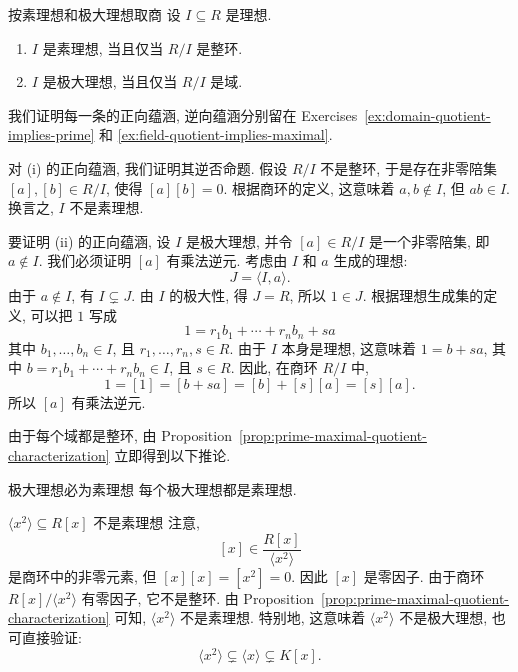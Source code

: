 \begin{Proposition}{按素理想和极大理想取商}\label{prop:prime-maximal-quotient-characterization}
  设 $I\subseteq R$ 是理想.
  \begin{enumerate}[label=(\roman*)]
    \item $I$ 是素理想, 当且仅当 $R/I$ 是整环.
    \item $I$ 是极大理想, 当且仅当 $R/I$ 是域.
  \end{enumerate}
\end{Proposition}

\begin{Proof}
  我们证明每一条的正向蕴涵, 逆向蕴涵分别留在 Exercises~\ref{ex:domain-quotient-implies-prime} 和 \ref{ex:field-quotient-implies-maximal}.

  对 (i) 的正向蕴涵, 我们证明其逆否命题. 假设 $R/I$ 不是整环, 于是存在非零陪集 $[a],[b]\in R/I$, 使得 $[a][b]=0$. 根据商环的定义, 这意味着 $a,b\notin I$, 但 $ab\in I$. 换言之, $I$ 不是素理想.

  要证明 (ii) 的正向蕴涵, 设 $I$ 是极大理想, 并令 $[a]\in R/I$ 是一个非零陪集, 即 $a\notin I$. 我们必须证明 $[a]$ 有乘法逆元. 考虑由 $I$ 和 $a$ 生成的理想:
  \[
    J=\langle I,a\rangle.
  \]
  由于 $a\notin I$, 有 $I\subsetneq J$. 由 $I$ 的极大性, 得 $J=R$, 所以 $1\in J$. 根据理想生成集的定义, 可以把 $1$ 写成
  \[
    1=r_{1}b_{1}+\cdots+r_{n}b_{n}+sa
  \]
  其中 $b_{1},\ldots,b_{n}\in I$, 且 $r_{1},\ldots,r_{n},s\in R$. 由于 $I$ 本身是理想, 这意味着 $1=b+sa$, 其中 $b=r_{1}b_{1}+\cdots+r_{n}b_{n}\in I$, 且 $s\in R$. 因此, 在商环 $R/I$ 中,
  \[
    1=[1]=[b+sa]=[b]+[s][a]=[s][a].
  \]
  所以 $[a]$ 有乘法逆元.
\end{Proof}

由于每个域都是整环, 由 Proposition~\ref{prop:prime-maximal-quotient-characterization} 立即得到以下推论.

\begin{Corollary}{极大理想必为素理想}\label{cor:maximal-implies-prime}
  每个极大理想都是素理想.
\end{Corollary}

\begin{Example}{{\textmd{$\langle x^{2}\rangle\subseteq R[x]$} 不是素理想}}\label{ex:square-variable-ideal-not-prime}
  注意,
  \[
    [x]\in\frac{R[x]}{\langle x^{2}\rangle}
  \]
  是商环中的非零元素, 但 $[x][x]=[x^{2}]=0$. 因此 $[x]$ 是零因子. 由于商环 $R[x]/\langle x^{2}\rangle$ 有零因子, 它不是整环. 由 Proposition~\ref{prop:prime-maximal-quotient-characterization} 可知, $\langle x^{2}\rangle$ 不是素理想. 特别地, 这意味着 $\langle x^{2}\rangle$ 不是极大理想, 也可直接验证:
  \[
    \langle x^{2}\rangle\subsetneq\langle x\rangle\subsetneq K[x].
  \]
\end{Example}

